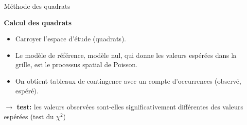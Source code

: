 \begin{frame}{Méthode des quadrats}

\textbf{Calcul des quadrats}

\begin{itemize}
  \item Carroyer l'espace d'étude (quadrats).
  \item Le modèle de référence, modèle nul, qui donne les valeurs espérées dans la grille, est le processus spatial de Poisson.
  \item On obtient tableaux de contingence avec un compte d'occurrences (observé, espéré).
\end{itemize}

$\rightarrow$ \textbf{test:} les valeurs observées sont-elles significativement différentes des valeurs espérées (test du $\chi^2$)

\end{frame}

